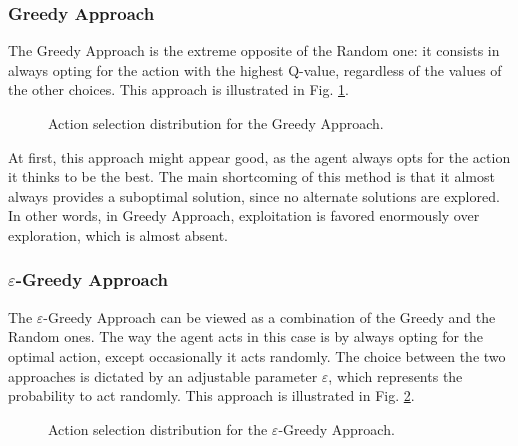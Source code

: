 \documentclass[a4paper, 12pt]{article}
\numberwithin{equation}{section}
\begin{document}
\subsubsection{Greedy Approach}

The Greedy Approach is the extreme opposite of the Random one: it consists in always opting for the action with the highest Q-value, regardless of the values of the other choices. This approach is illustrated in Fig. \ref{fig:greedy}.

\begin{figure}[h]
	\centering
		\caption{Action selection distribution for the Greedy Approach.}
	\label{fig:greedy}
\end{figure}

At first, this approach might appear good, as the agent always opts for the action it thinks to be the best. The main shortcoming of this method is that it almost always provides a suboptimal solution, since no alternate solutions are explored. In other words, in Greedy Approach, exploitation is favored enormously over exploration, which is almost absent. 





\subsubsection{$\varepsilon$-Greedy Approach}

The $\varepsilon$-Greedy Approach can be viewed as a combination of the Greedy and the Random ones. The way the agent acts in this case is by always opting for the optimal action, except occasionally it acts randomly. The choice between the two approaches is dictated by an adjustable parameter $\varepsilon$, which represents the probability to act randomly. This approach is illustrated in Fig. \ref{fig:epsilon}.

\begin{figure}[h]
	\centering
		\caption{Action selection distribution for the $\varepsilon$-Greedy Approach.}
	\label{fig:epsilon}
\end{figure}
\end{document}

